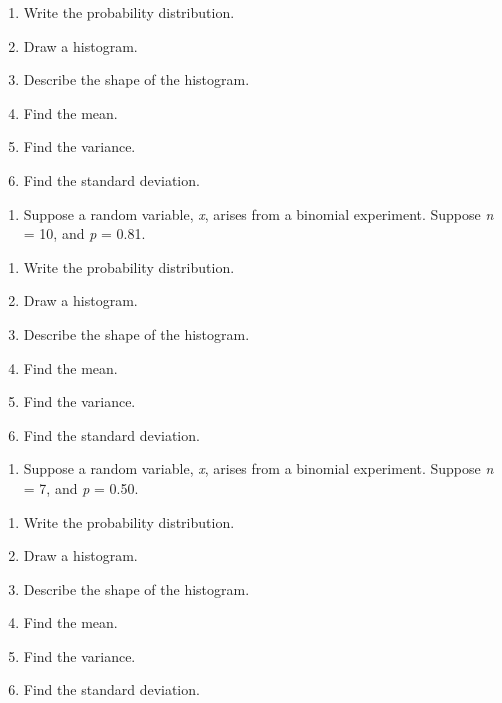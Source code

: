 \documentclass[]{book}
\providecommand{\tightlist}{%
  \setlength{\itemsep}{0pt}\setlength{\parskip}{0pt}}
\begin{document}
\begin{enumerate}
\def\labelenumi{\alph{enumi}.}
\tightlist
\item
  Write the probability distribution.
\item
  Draw a histogram.
\item
  Describe the shape of the histogram.
\item
  Find the mean.
\item
  Find the variance.
\item
  Find the standard deviation.
\end{enumerate}

\begin{enumerate}
\def\labelenumi{\arabic{enumi}.}
\setcounter{enumi}{1}
\tightlist
\item
  Suppose a random variable, \emph{x}, arises from a binomial experiment. Suppose \emph{n} = 10, and \emph{p} = 0.81.
\end{enumerate}

\begin{enumerate}
\def\labelenumi{\alph{enumi}.}
\tightlist
\item
  Write the probability distribution.
\item
  Draw a histogram.
\item
  Describe the shape of the histogram.
\item
  Find the mean.
\item
  Find the variance.
\item
  Find the standard deviation.
\end{enumerate}

\begin{enumerate}
\def\labelenumi{\arabic{enumi}.}
\setcounter{enumi}{2}
\tightlist
\item
  Suppose a random variable, \emph{x}, arises from a binomial experiment. Suppose \emph{n} = 7, and \emph{p} = 0.50.
\end{enumerate}

\begin{enumerate}
\def\labelenumi{\alph{enumi}.}
\tightlist
\item
  Write the probability distribution.
\item
  Draw a histogram.
\item
  Describe the shape of the histogram.
\item
  Find the mean.
\item
  Find the variance.
\item
  Find the standard deviation.
\end{enumerate}
\end{document}
